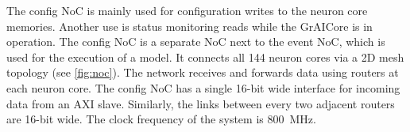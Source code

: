 The config NoC is mainly used for configuration writes to the neuron core memories.
Another use is status monitoring reads while the GrAICore is in operation.
The config NoC is a separate NoC next to the event NoC, which is used for the execution of a model.
It connects all 144 neuron cores via a 2D mesh topology (see \cref{fig:noc}).
The network receives and forwards data using routers at each neuron core.
The config NoC has a single 16-bit wide interface for incoming data from an AXI slave.
Similarly, the links between every two adjacent routers are 16-bit wide. 
The clock frequency of the system is \SI{800}{MHz}.
